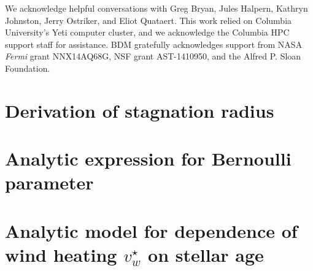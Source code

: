 \documentclass[usenatbib,fleqn]{mn2e}
\newcommand{\vwO}{v_{w}}
\begin{document}
We acknowledge helpful conversations with Greg Bryan, Jules Halpern,
Kathryn Johnston, Jerry Ostriker, and Eliot Quataert.  This work
relied on Columbia University's Yeti computer cluster, and we
acknowledge the Columbia HPC support staff for assistance.  BDM
gratefully acknowledges support from NASA {\it Fermi} grant
NNX14AQ68G, NSF grant AST-1410950, and the Alfred P. Sloan Foundation.


  \clearpage
  \appendix
  \section{Derivation of stagnation radius}
  \label{app:rs}
  

  \section{Analytic expression for Bernoulli parameter}
  \label{app:be}
  

  \section{Analytic model for dependence of wind heating $\vwO^{\star}$ on stellar age}
\label{app:windheat}


  \footnotesize{
    
    
  }
\end{document}
